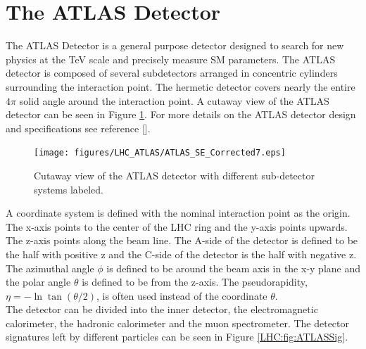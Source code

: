\section{The ATLAS Detector}
\label{LHC:detector}

\indent The ATLAS Detector is a general purpose detector designed to search for new physics at the TeV scale and precisely measure SM parameters.  The ATLAS detector is composed of several subdetectors arranged in concentric cylinders surrounding the interaction point.  The hermetic detector covers nearly the entire $4\pi$ solid angle around the interaction point. A cutaway view of the ATLAS detector can be seen in Figure \ref{LHC:fig:ATLASDet}.  For more details on the ATLAS detector design and specifications see reference [\cite{ATLAS_JINST}].  \\


\begin{figure}[h!]
\centering
\texttt{[image: figures/LHC\_ATLAS/ATLAS\_SE\_Corrected7.eps]}
\caption{ Cutaway view of the ATLAS detector with different sub-detector systems labeled. \label{LHC:fig:ATLASDet}}
\end{figure}

\indent A coordinate system is defined with the nominal interaction point as the origin.  The x-axis points to the center of the LHC ring and the y-axis points upwards.  The z-axis points along the beam line.  The A-side of the detector is defined to be the half with positive z and the C-side of the detector is the half with negative z.  The azimuthal angle $\phi$ is defined to be around the beam axis in the x-y plane and the polar angle $\theta$ is defined to be from the z-axis.  The pseudorapidity, $\eta = -\ln  \tan (\theta/2) $, is often used instead of the coordinate $\theta$.  \\%

\indent The detector can be divided into the inner detector, the electromagnetic calorimeter, the hadronic calorimeter and the muon spectrometer.  The detector signatures left by different particles can be seen in Figure \ref{LHC:fig:ATLASSig}. \\

